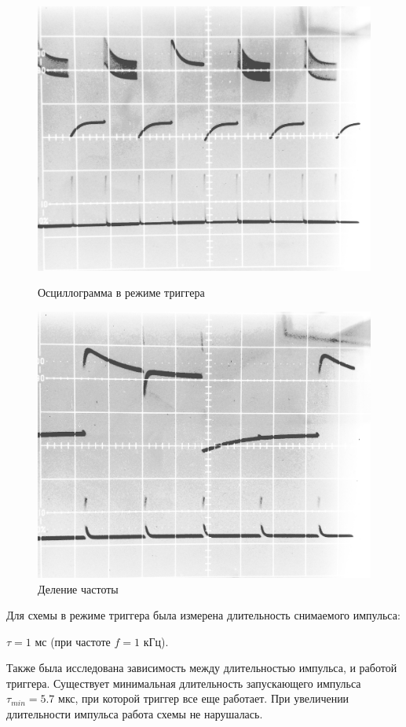 \begin{figure}[H]
	\begin{minipage}{.49\linewidth}
		\centering
		\includegraphics[width = .7\linewidth]{img/3.jpg}
		\caption{Осциллограмма в режиме триггера}
		\label{fig:2}
	\end{minipage}
	\begin{minipage}{.49\linewidth}
		\centering
		\includegraphics[width = .7\linewidth]{img/8.jpg}
		\caption{Деление частоты}
		\label{fig:3}
	\end{minipage}

\end{figure}

Для схемы в режиме триггера была измерена длительность снимаемого импульса:

$\tau = 1$ мс (при частоте $f = 1$ кГц).

Также была исследована зависимость между длительностью импульса, и работой триггера. Существует минимальная длительность
запускающего импульса $\tau_{min} = 5.7$ мкс, при которой триггер все еще работает. При увеличении длительности
импульса работа схемы не нарушалась.

